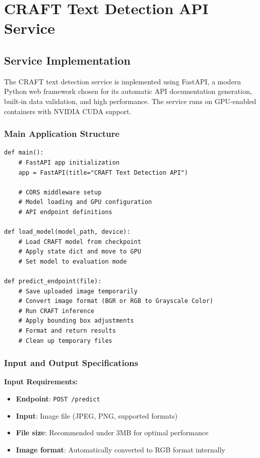 {\section{CRAFT Text Detection API Service}
\label{sec:craft-api}

\subsection{Service Implementation}
\label{subsec:craft-implementation}

The CRAFT text detection service is implemented using FastAPI, a modern Python web framework chosen for its automatic API documentation generation, built-in data validation, and high performance. The service runs on GPU-enabled containers with NVIDIA CUDA support.

\subsubsection*{Main Application Structure}

\begin{verbatim}
def main():
    # FastAPI app initialization
    app = FastAPI(title="CRAFT Text Detection API")

    # CORS middleware setup
    # Model loading and GPU configuration
    # API endpoint definitions

def load_model(model_path, device):
    # Load CRAFT model from checkpoint
    # Apply state dict and move to GPU
    # Set model to evaluation mode

def predict_endpoint(file):
    # Save uploaded image temporarily
    # Convert image format (BGR or RGB to Grayscale Color)
    # Run CRAFT inference
    # Apply bounding box adjustments
    # Format and return results
    # Clean up temporary files

\end{verbatim}

\subsubsection*{Input and Output Specifications}

\textbf{Input Requirements:}
\begin{itemize}
\item \textbf{Endpoint}: \texttt{POST /predict}
\item \textbf{Input}: Image file (JPEG, PNG, supported formats)
\item \textbf{File size}: Recommended under 3MB for optimal performance
\item \textbf{Image format}: Automatically converted to RGB format internally
\end{itemize}

}
